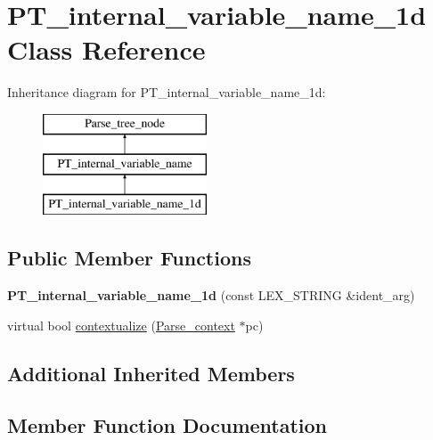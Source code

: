 \hypertarget{classPT__internal__variable__name__1d}{}\section{P\+T\+\_\+internal\+\_\+variable\+\_\+name\+\_\+1d Class Reference}
\label{classPT__internal__variable__name__1d}
Inheritance diagram for P\+T\+\_\+internal\+\_\+variable\+\_\+name\+\_\+1d\+:\begin{figure}[H]
\begin{center}
\leavevmode
\includegraphics[height=3.000000cm]{classPT__internal__variable__name__1d}
\end{center}
\end{figure}
\subsection*{Public Member Functions}
\begin{DoxyCompactItemize}
\item 
\mbox{\label{classPT__internal__variable__name__1d_a52944cbbba87de048ddb600ecb273b25}} 
{\bfseries P\+T\+\_\+internal\+\_\+variable\+\_\+name\+\_\+1d} (const L\+E\+X\+\_\+\+S\+T\+R\+I\+NG \&ident\+\_\+arg)
\item 
virtual bool \mbox{\hyperlink{classPT__internal__variable__name__1d_a2141449ee3d2101cba5bc1732c05504a}{contextualize}} (\mbox{\hyperlink{structParse__context}{Parse\+\_\+context}} $\ast$pc)
\end{DoxyCompactItemize}
\subsection*{Additional Inherited Members}


\subsection{Member Function Documentation}
\mbox{\label{classPT__internal__variable__name__1d_a2141449ee3d2101cba5bc1732c05504a}} 
